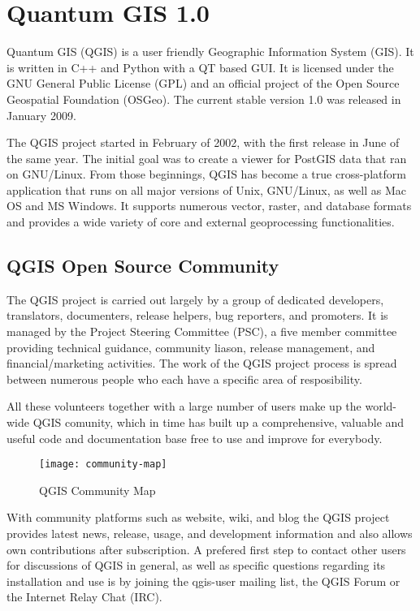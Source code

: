 \section{Quantum GIS 1.0}
\setcounter{page}{1}

Quantum GIS (QGIS) is a user friendly Geographic Information System (GIS).
It is written in C++ and Python with a QT based GUI. It is licensed under the
GNU General Public License (GPL) and an official project of the Open Source
Geospatial Foundation (OSGeo). The current stable version 1.0 was released in
January 2009. 


The QGIS project started in February of 2002, with the first release in June
of the same year. The initial goal was to create a viewer for PostGIS data
that ran on GNU/Linux. From those beginnings, QGIS has become a true
cross-platform application that runs on all major versions of Unix,
GNU/Linux, as well as Mac OS and MS Windows. It supports numerous vector,
raster, and database formats and provides a wide variety of core and external
geoprocessing functionalities.

\subsection{QGIS Open Source Community}

The QGIS project is carried out largely by a group of dedicated developers,
translators, documenters, release helpers, bug reporters, and promoters. It
is managed by the Project Steering Committee (PSC), a five member committee
providing technical guidance, community liason, release management, and
financial/marketing activities. The work of the QGIS project process is
spread between numerous people who each have a specific area of
resposibility. 

All these volunteers together with a large number of users make up the
world-wide QGIS comunity, which in time has built up a comprehensive,
valuable and useful code and documentation base free to use and improve for
everybody.

\begin{figure}[h]
   \begin{center}
   \caption{QGIS Community Map}\label{fig:community-map}\smallskip
   \texttt{[image: community-map]}
\end{center}
\end{figure}

With community platforms such as website, wiki, and blog the QGIS project
provides latest news, release, usage, and development information and also
allows own contributions after subscription. A prefered first step to contact
other users for discussions of QGIS in general, as well as specific questions
regarding its installation and use is by joining the qgis-user mailing list,
the QGIS Forum or the Internet Relay Chat (IRC).


